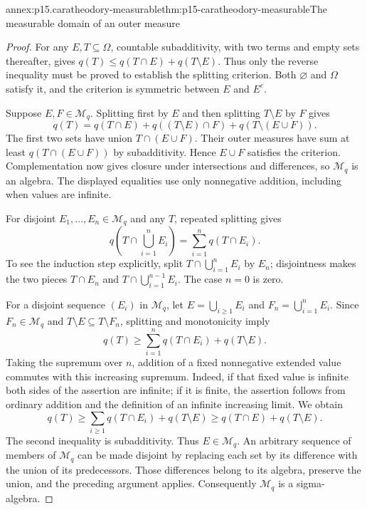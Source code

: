 \begin{annexitem}{annex:p15.caratheodory-measurable}{thm:p15-caratheodory-measurable}{The measurable domain of an outer measure}
\begin{proof}
For any \(E,T\subseteq\Omega\), countable subadditivity, with two
terms and empty sets thereafter, gives
\(q(T)\leq q(T\cap E)+q(T\setminus E)\). Thus only the reverse
inequality must be proved to establish the splitting criterion.
Both \(\varnothing\) and \(\Omega\) satisfy it, and the criterion
is symmetric between \(E\) and \(E^c\).

Suppose \(E,F\in\mathcal M_q\). Splitting first by \(E\) and
then splitting \(T\setminus E\) by \(F\) gives
\[
 q(T)=q(T\cap E)+q((T\setminus E)\cap F)
                         +q(T\setminus(E\cup F)).
\]
The first two sets have union \(T\cap(E\cup F)\). Their outer
measures have sum at least \(q(T\cap(E\cup F))\) by subadditivity.
Hence \(E\cup F\) satisfies the criterion. Complementation now
gives closure under intersections and differences, so \(\mathcal M_q\)
is an algebra. The displayed equalities use only nonnegative addition,
including when values are infinite.

For disjoint \(E_1,\ldots,E_n\in\mathcal M_q\) and any \(T\),
repeated splitting gives
\[
 q\left(T\cap\bigcup_{i=1}^n E_i\right)
                   =\sum_{i=1}^n q(T\cap E_i).
\]
To see the induction step explicitly, split
\(T\cap\bigcup_{i=1}^n E_i\) by \(E_n\); disjointness makes
the two pieces \(T\cap E_n\) and
\(T\cap\bigcup_{i=1}^{n-1}E_i\). The case \(n=0\) is zero.

For a disjoint sequence \((E_i)\) in \(\mathcal M_q\), let
\(E=\bigcup_{i\geq1}E_i\) and \(F_n=\bigcup_{i=1}^n E_i\).
Since \(F_n\in\mathcal M_q\) and \(T\setminus E\subseteq
T\setminus F_n\), splitting and monotonicity imply
\[
 q(T)\geq\sum_{i=1}^n q(T\cap E_i)+q(T\setminus E).
\]
Taking the supremum over \(n\), addition of a fixed nonnegative
extended value commutes with this increasing supremum. Indeed, if that
fixed value is infinite both sides of the assertion are infinite; if
it is finite, the assertion follows from ordinary addition and the
definition of an infinite increasing limit. We obtain
\[
 q(T)\geq\sum_{i\geq1}q(T\cap E_i)+q(T\setminus E)
       \geq q(T\cap E)+q(T\setminus E).
\]
The second inequality is subadditivity. Thus \(E\in\mathcal M_q\).
An arbitrary sequence of members of \(\mathcal M_q\) can be made
disjoint by replacing each set by its difference with the union of its
predecessors. Those differences belong to its algebra, preserve the
union, and the preceding argument applies. Consequently
\(\mathcal M_q\) is a sigma-algebra.


\end{proof}
\end{annexitem}
